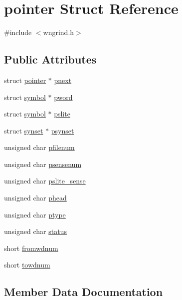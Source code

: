 \hypertarget{structpointer}{}\section{pointer Struct Reference}
\label{structpointer}


{\ttfamily \#include $<$wngrind.\+h$>$}

\subsection*{Public Attributes}
\begin{DoxyCompactItemize}
\item 
struct \hyperlink{structpointer}{pointer} $\ast$ \hyperlink{structpointer_a191952bc0b9b802975d59b1e9c663080}{pnext}
\item 
struct \hyperlink{structsymbol}{symbol} $\ast$ \hyperlink{structpointer_a1e80a677e0a813fedff45f1a74698ffa}{pword}
\item 
struct \hyperlink{structsymbol}{symbol} $\ast$ \hyperlink{structpointer_aae2b5fcdb1d0ab1eac2bb62dbe1e51b1}{pslite}
\item 
struct \hyperlink{structsynset}{synset} $\ast$ \hyperlink{structpointer_ae01149051e6e0c9bf23af66a344e75c4}{psynset}
\item 
unsigned char \hyperlink{structpointer_aa839df8d7055383f0db6381ea17247e7}{pfilenum}
\item 
unsigned char \hyperlink{structpointer_af021d79af2091e7b5e83f2488e57ff15}{psensenum}
\item 
unsigned char \hyperlink{structpointer_a1f1b809e01cb5b8a3e173daad25c618b}{pslite\+\_\+sense}
\item 
unsigned char \hyperlink{structpointer_a41d60761061d4a59d7505718e3ce238c}{phead}
\item 
unsigned char \hyperlink{structpointer_a0a439e7d33e942b0fe6a83d69b3f3692}{ptype}
\item 
unsigned char \hyperlink{structpointer_aabc225612d909de56a62ed8fd17df4da}{status}
\item 
short \hyperlink{structpointer_a35bac714d020359eae5c177754c79290}{fromwdnum}
\item 
short \hyperlink{structpointer_ad23ff477ec4f2bb93594e8c5b295a573}{towdnum}
\end{DoxyCompactItemize}


\subsection{Member Data Documentation}
